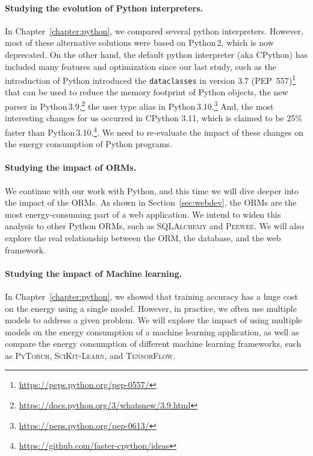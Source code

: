 \paragraph{Studying the evolution of Python interpreters.}
In Chapter~\ref{chapter:python}, we compared several python interpreters.
However, most of these alternative solutions were based on Python\,2, which is now deprecated.
On the other hand, the default python interpreter (aka CPython) has included many features and optimization since our last study, such as the introduction of Python introduced the \texttt{dataclasses} in version 3.7 (PEP~557)\footnote{\url{https://peps.python.org/pep-0557/}} that can be used to reduce the memory footprint of Python objects, the new parser in Python\,3.9,\footnote{\url{https://docs.python.org/3/whatsnew/3.9.html}} the user type alias in Python\,3.10.\footnote{\url{https://peps.python.org/pep-0613/}}
And, the most interesting changes for us occurred in CPython 3.11, which is claimed to be 25\% faster than Python\,3.10.\footnote{\url{https://github.com/faster-cpython/ideas}}.
We need to re-evaluate the impact of these changes on the energy consumption of Python programs.

\paragraph{Studying the impact of ORMs.}
We continue with our work with Python, and this time we will dive deeper into the impact of the ORMs.
As shown in Section~\ref{sec:webdev}, the ORMs are the most energy-consuming part of a web application.
We intend to widen this analysis to other Python ORMs, such as \textsc{SQLAlchemy} and \textsc{Peewee}.
We will also explore the real relationship between the ORM, the database, and the web framework.

\paragraph{Studying the impact of Machine learning.}
In Chapter~\ref{chapter:python}, we showed that training accuracy has a huge cost on the energy using a single model.
However, in practice, we often use multiple models to address a given problem.
We will explore the impact of using multiple models on the energy consumption of a machine learning application, as well as compare the energy consumption of different machine learning frameworks, such as \textsc{PyTorch}, \textsc{SciKit-Learn}, and \textsc{TensorFlow}.



